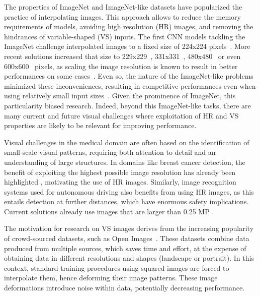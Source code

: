 \documentclass{article}
\begin{document}
The properties of ImageNet and ImageNet-like datasets have popularized the practice of interpolating images. This approach allows to reduce the memory requirements of models, avoiding high resolution (HR) images, and removing the hindrances of variable-shaped (VS) inputs. The first CNN models tackling the ImageNet challenge interpolated images to a fixed size of 224x224 pixels~\citep{simonyan2014very, szegedy2015going}. More recent solutions increased that size to 229x229~\citep{szegedy2016rethinking}, 331x331~\citep{zoph2018learning}, 480x480~\citep{huang2019gpipe} or even 600x600~\citep{he2017mask, lin2017feature} pixels, as scaling the image resolution is known to result in better performances on some cases~\citep{tan2019efficientnet,ghosh2019reshaping}. Even so, the nature of the ImageNet-like problems minimized these inconveniences, resulting in competitive performances even when using relatively small input sizes~\citep{xie2019selftraining}. Given the prominence of ImageNet, this particularity biased research. Indeed, beyond this ImageNet-like tasks, there are many current and future visual challenges where exploitation of HR and VS  properties are likely to be relevant for improving performance.

Visual challenges in the medical domain are often based on the identification of small-scale visual patterns, requiring both attention to detail and an understanding of large structures. In domains like breast cancer detection, the benefit of exploiting the highest possible image resolution has already been highlighted \citep{geras2017high, lotter2017multi}, motivating the use of HR images. Similarly, image recognition systems used for autonomous driving also benefits from using HR images, as this entails detection at further distances, which have enormous safety implications. Current solutions already use images that are larger than 0.25 MP \citep{chen2017multi, treml2016speeding}.

The motivation for research on VS images derives from the increasing popularity of crowd-sourced datasets, such as Open Images~\citep{OpenImages}. These datasets combine data produced from multiple sources, which saves time and effort, at the expense of obtaining data in different resolutions and shapes (\eg landscape or portrait). In this context, standard training procedures using squared images are forced to interpolate them, hence deforming their image patterns. These image deformations introduce noise within data, potentially decreasing performance.
\end{document}
